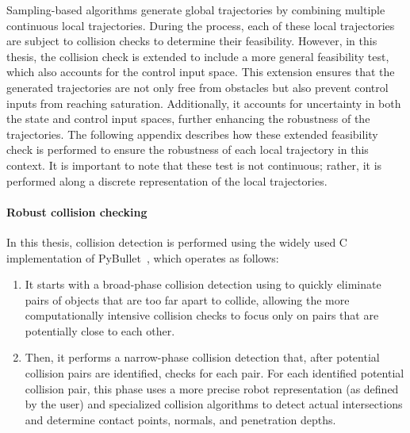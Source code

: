 

Sampling-based algorithms generate global trajectories by combining multiple continuous local trajectories.
During the process, each of these local trajectories are subject to collision checks to determine their feasibility.
However, in this thesis, the collision check is extended to include a more general feasibility test, which also accounts for the control input space. 
This extension ensures that the generated trajectories are not only free from obstacles but also prevent control inputs from reaching saturation. 
Additionally, it accounts for uncertainty in both the state and control input spaces, further enhancing the robustness of the trajectories.
The following appendix describes how these extended feasibility check is performed to ensure the robustness of each local trajectory in this context.
It is important to note that these test is not continuous; rather, it is performed along a discrete representation of the local trajectories.

\paragraph{Robust collision checking}

In this thesis, collision detection is performed using the widely used C implementation of PyBullet~\cite{cBullet}, which operates as follows: 
\begin{enumerate}
    \item It starts with a broad-phase collision detection using  to quickly eliminate pairs of objects that are too far apart to collide, allowing the more computationally intensive collision checks to focus only on pairs that are potentially close to each other.
    \item Then, it performs a narrow-phase collision detection that, after potential collision pairs are identified, checks for each pair. 
    For each identified potential collision pair, this phase uses a more precise robot representation (as defined by the user) and specialized collision algorithms to detect actual intersections and determine contact points, normals, and penetration depths.
\end{enumerate}

